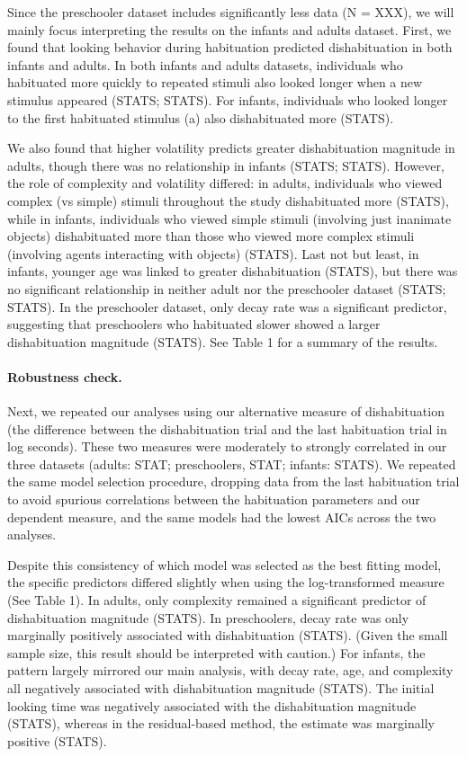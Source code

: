 \documentclass[10pt, letterpaper]{article}
\begin{document}
Since the preschooler dataset includes significantly less data (N =
XXX), we will mainly focus interpreting the results on the infants and
adults dataset. First, we found that looking behavior during habituation
predicted dishabituation in both infants and adults. In both infants and
adults datasets, individuals who habituated more quickly to repeated
stimuli also looked longer when a new stimulus appeared (STATS; STATS).
For infants, individuals who looked longer to the first habituated
stimulus (a) also dishabituated more (STATS).

We also found that higher volatility predicts greater dishabituation
magnitude in adults, though there was no relationship in infants (STATS;
STATS). However, the role of complexity and volatility differed: in
adults, individuals who viewed complex (vs simple) stimuli throughout
the study dishabituated more (STATS), while in infants, individuals who
viewed simple stimuli (involving just inanimate objects) dishabituated
more than those who viewed more complex stimuli (involving agents
interacting with objects) (STATS). Last not but least, in infants,
younger age was linked to greater dishabituation (STATS), but there was
no significant relationship in neither adult nor the preschooler dataset
(STATS; STATS). In the preschooler dataset, only decay rate was a
significant predictor, suggesting that preschoolers who habituated
slower showed a larger dishabituation magnitude (STATS). See Table 1 for
a summary of the results.

\hypertarget{robustness-check.}{%
\paragraph{Robustness check.}\label{robustness-check.}}

Next, we repeated our analyses using our alternative measure of
dishabituation (the difference between the dishabituation trial and the
last habituation trial in log seconds). These two measures were
moderately to strongly correlated in our three datasets (adults: STAT;
preschoolers, STAT; infants: STATS). We repeated the same model
selection procedure, dropping data from the last habituation trial to
avoid spurious correlations between the habituation parameters and our
dependent measure, and the same models had the lowest AICs across the
two analyses.

Despite this consistency of which model was selected as the best fitting
model, the specific predictors differed slightly when using the
log-transformed measure (See Table 1). In adults, only complexity
remained a significant predictor of dishabituation magnitude (STATS). In
preschoolers, decay rate was only marginally positively associated with
dishabituation (STATS). (Given the small sample size, this result should
be interpreted with caution.) For infants, the pattern largely mirrored
our main analysis, with decay rate, age, and complexity all negatively
associated with dishabituation magnitude (STATS). The initial looking
time was negatively associated with the dishabituation magnitude
(STATS), whereas in the residual-based method, the estimate was
marginally positive (STATS).
\end{document}

